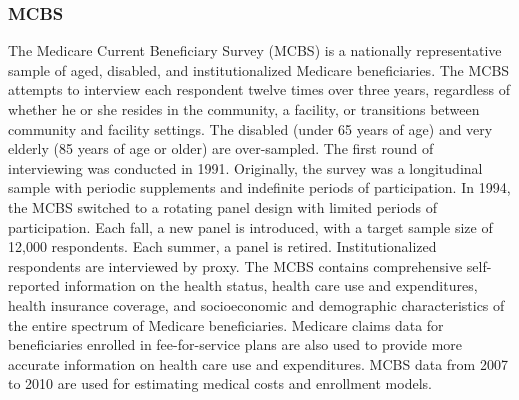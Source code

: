 \subsubsection{MCBS}
\noindent The Medicare Current Beneficiary Survey (MCBS) is a nationally representative sample of aged, disabled, 
and institutionalized Medicare beneficiaries.  The MCBS attempts to interview each respondent twelve 
times over three years, regardless of whether he or she resides in the community, a facility, or 
transitions between community and facility settings. The disabled (under 65 years of age) and 
very elderly (85 years of age or older) are over-sampled. The first round of interviewing was conducted 
in 1991. Originally, the survey was a longitudinal sample with periodic supplements and indefinite 
periods of participation. In 1994, the MCBS switched to a rotating panel design with limited periods 
of participation. Each fall, a new panel is introduced, with a target sample size of 12,000 respondents. Each summer, a panel is retired. Institutionalized respondents are interviewed by proxy.  The MCBS 
contains comprehensive self-reported information on the health status, health care use and 
expenditures, health insurance coverage, and socioeconomic and demographic characteristics of the 
entire spectrum of Medicare beneficiaries.  Medicare claims data for beneficiaries enrolled in 
fee-for-service plans are also used to provide more accurate information on health care use and 
expenditures.  MCBS data from 2007 to 2010 are used for estimating medical costs and enrollment models. \\

